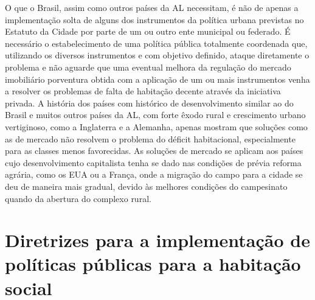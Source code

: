 \documentclass[
	12pt,				%
	oneside,			%
	a4paper,			%
	chapter=TITLE,		%
	section=TITLE,		%
	english,			%
	brazil				%
	]{abntex2}
\begin{document}
O que o Brasil, assim como outros países da \gls{AL} necessitam, é não de
apenas a implementação solta de alguns dos instrumentos da política urbana
previstas no Estatuto da Cidade por parte de um ou outro ente municipal ou
federado. É necessário o estabelecimento de uma política pública totalmente
coordenada que, utilizando os diversos instrumentos e com objetivo definido,
ataque diretamente o problema e não aguarde que uma eventual melhora da
regulação do mercado imobiliário porventura obtida com a aplicação de um ou mais
instrumentos venha a resolver os problemas de falta de habitação decente através
da iniciativa privada. A história dos países com histórico de desenvolvimento
similar ao do Brasil e muitos outros países da \gls{AL}, com forte êxodo rural e
crescimento urbano vertiginoso, como a Inglaterra e a Alemanha, apenas mostram
que soluções como as de mercado não resolvem o problema do déficit habitacional,
especialmente para as classes menos favorecidas. As soluções de mercado se
aplicam aos países cujo desenvolvimento capitalista tenha se dado nas condições
de prévia reforma agrária, como os EUA ou a França, onde a migração do campo
para a cidade se deu de maneira mais gradual, devido às melhores condições do
campesinato quando da abertura do complexo rural.

\hypertarget{diretrizes-para-a-implementauxe7uxe3o-de-poluxedticas-puxfablicas-para-a-habitauxe7uxe3o-social}{%
\section{Diretrizes para a implementação de políticas públicas para a habitação social}\label{diretrizes-para-a-implementauxe7uxe3o-de-poluxedticas-puxfablicas-para-a-habitauxe7uxe3o-social}}
\end{document}
